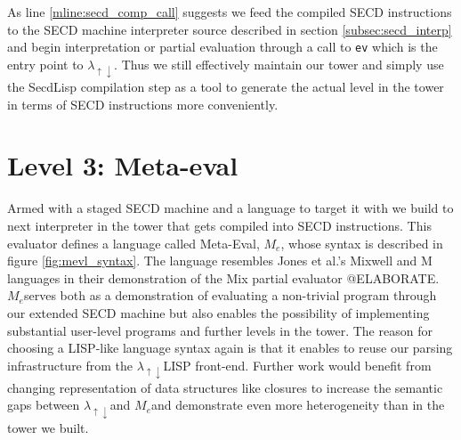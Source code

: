\documentclass{article}
\theoremstyle{definition}
\newcommand{\mslang}{$\lambda_{\uparrow\downarrow}$}
\newcommand{\mevl}{$M_{e}$}
\newcommand{\secdlisp}{SecdLisp}
\begin{document}
As line \ref{mline:secd_comp_call} suggests we feed the compiled SECD instructions to the SECD machine interpreter source described in section \ref{subsec:secd_interp} and begin interpretation or partial evaluation through a call to \texttt{ev} which is the entry point to \mslang. Thus we still effectively maintain our tower and simply use the \secdlisp{} compilation step as a tool to generate the actual level in the tower in terms of SECD instructions more conveniently.

\section{Level 3: Meta-eval}
Armed with a staged SECD machine and a language to target it with we build to next interpreter in the tower that gets compiled into SECD instructions. This evaluator defines a language called Meta-Eval, \mevl, whose syntax is described in figure \ref{fig:mevl_syntax}. The language resembles Jones et al.'s Mixwell and M languages in their demonstration of the Mix partial evaluator \cite{jones1989mix} @ELABORATE. \mevl serves both as a demonstration of evaluating a non-trivial program through our extended SECD machine but also enables the possibility of implementing substantial user-level programs and further levels in the tower. The reason for choosing a LISP-like language syntax again is that it enables to reuse our parsing infrastructure from the \mslang LISP front-end. Further work would benefit from changing representation of data structures like closures to increase the semantic gaps between \mslang and \mevl and demonstrate even more heterogeneity than in the tower we built.
\end{document}
